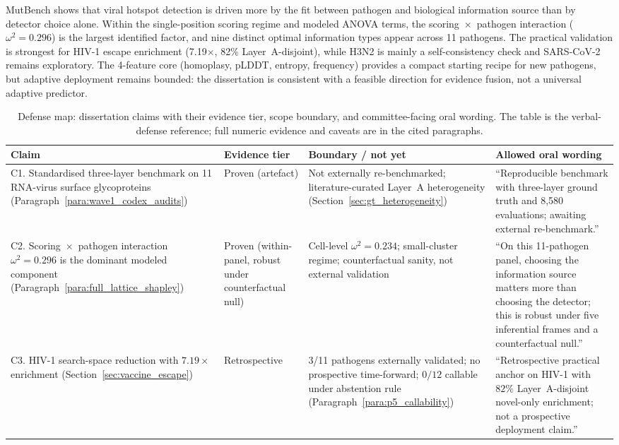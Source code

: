 MutBench shows that viral hotspot detection is driven more by the fit between pathogen and biological information source than by detector choice alone. Within the single-position scoring regime and modeled ANOVA terms, the scoring~$\times$~pathogen interaction ($\omega^2=0.296$) is the largest identified factor, and nine distinct optimal information types appear across 11 pathogens. The practical validation is strongest for HIV-1 escape enrichment (7.19$\times$, 82\% Layer~A-disjoint), while H3N2 is mainly a self-consistency check and SARS-CoV-2 remains exploratory. The 4-feature core (homoplasy, pLDDT, entropy, frequency) provides a compact starting recipe for new pathogens, but adaptive deployment remains bounded: the dissertation is consistent with a feasible direction for evidence fusion, not a universal adaptive predictor.
\begin{table}[htbp]
\centering
\caption{Defense map: dissertation claims with their evidence tier, scope boundary, and committee-facing oral wording. The table is the verbal-defense reference; full numeric evidence and caveats are in the cited paragraphs.}
\label{tab:defense_map}
\small
\begin{tabular}{p{}p{}p{}p{}}
\toprule
\textbf{Claim} & \textbf{Evidence tier} & \textbf{Boundary / not yet} & \textbf{Allowed oral wording} \\
\midrule
C1. Standardised three-layer benchmark on 11 RNA-virus surface glycoproteins (Paragraph~\ref{para:wave1_codex_audits}) & Proven (artefact) & Not externally re-benchmarked; literature-curated Layer~A heterogeneity (Section~\ref{sec:gt_heterogeneity}) & ``Reproducible benchmark with three-layer ground truth and 8{,}580 evaluations; awaiting external re-benchmark.'' \\
C2. Scoring~$\times$~pathogen interaction $\omega^2 = 0.296$ is the dominant modeled component (Paragraph~\ref{para:full_lattice_shapley}) & Proven (within-panel, robust under counterfactual null) & Cell-level $\omega^2 = 0.234$; small-cluster regime; counterfactual sanity, not external validation & ``On this 11-pathogen panel, choosing the information source matters more than choosing the detector; this is robust under five inferential frames and a counterfactual null.'' \\
C3. HIV-1 search-space reduction with $7.19\times$ enrichment (Section~\ref{sec:vaccine_escape}) & Retrospective & 3/11 pathogens externally validated; no prospective time-forward; $0/12$ callable under abstention rule (Paragraph~\ref{para:p5_callability}) & ``Retrospective practical anchor on HIV-1 with $82\%$ Layer~A-disjoint novel-only enrichment; not a prospective deployment claim.'' \\

\end{tabular}
\end{table}
